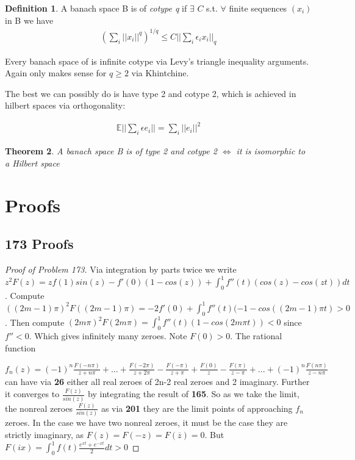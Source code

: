 \documentclass[10pt]{article}
\newcommand{\E}{\mathbb{E}}
\newcommand{\1}{\textbf{1}}
\newcommand{\norm}[1]{||#1||}
\newtheorem{theorem}{Theorem}
\theoremstyle{remark}
\theoremstyle{definition}
\newtheorem{defn}[theorem]{Definition}
\begin{document}
\begin{defn}
	A banach space B is of \textit{cotype q} if $\exists$ $C$ s.t. $\forall$ finite sequences $(x_i)$ in B we have
	\begin{align*}
		(\sum_i \norm{x_i}^q)^{1/q} \leq C \norm{\sum_i \epsilon_i x_i}_q
	\end{align*}
\end{defn}

Every banach space of is infinite cotype via Levy's triangle inequality arguments. Again only makes sense for $q \geq 2$ via Khintchine.

The best we can possibly do is have type 2 and cotype 2, which is achieved in hilbert spaces via orthogonality:

\begin{align*}
	\E \norm{\sum_i \epsilon e_i} = \sum_i\norm{e_i}^2
\end{align*}

\begin{theorem}
	A banach space B is of type 2 and cotype 2 $\iff$ it is isomorphic to a Hilbert space
\end{theorem}


\section{Proofs}


\subsection{173 Proofs}

\begin{proof}[Proof of Problem 173]
	Via integration by parts twice we write $z^2 F(z) = zf(1)sin(z) - f'(0)(1-cos(z)) + \int_0^1 f''(t)(cos(z)-cos(zt))dt$. Compute $((2m-1)\pi)^2F((2m-1)\pi) = -2f'(0)+\int_0^1f''(t)(-1-cos((2m-1)\pi t) > 0$. Then compute $(2m \pi)^2F(2m\pi) = \int_0^1f''(t)(1-cos(2m\pi t)) < 0$ since $f'' < 0$. Which gives infinitely many zeroes. Note $F(0)>0$. The rational function

	$f_n(z) = (-1)^n\frac{F(-n\pi)}{z+n\pi} + ... + \frac{F(-2\pi)}{z+2\pi}-\frac{F(-\pi)}{z+\pi}+\frac{F(0)}{z}-\frac{F(\pi)}{z-\pi}+...+(-1)^n\frac{F(n\pi)}{z-n\pi}$ can have via \textbf{26} either all real zeroes of 2n-2 real zeroes and 2 imaginary. Further it converges to $\frac{F(z)}{sin(z)}$ by integrating the result of \textbf{165}. So as we take the limit, the nonreal zeroes $\frac{F(z)}{sin(z)}$ as via \textbf{201} they are the limit points of approaching $f_n$ zeroes. In the case we have two nonreal zeroes, it must be the case they are strictly imaginary, as $F(z) = F(-z) =F(\overline{z})= 0$. But $F(ix) = \int_0^1 f(t)\frac{e^{xt}+e^{-xt}}{2}dt > 0$
\end{proof}
\end{document}
